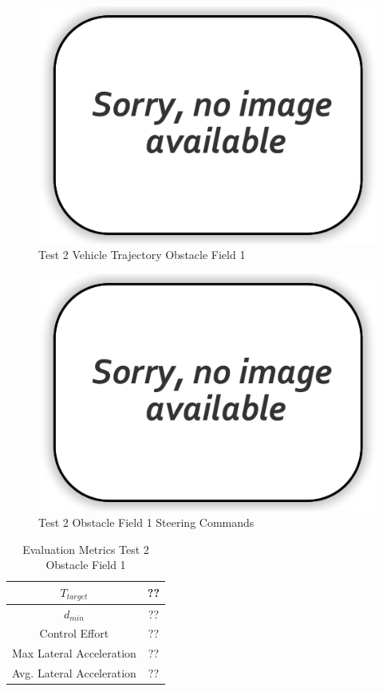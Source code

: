\documentclass[12pt,twocolumn]{article}
\begin{document}
\begin{figure}
	\centering
	\includegraphics[width=\columnwidth]{Figs/no-image.png}
	\caption{\small Test 2 Vehicle Trajectory Obstacle Field 1}  
	\label{fig:Test2_Obst1}
\end{figure}

\begin{figure}
	\centering
	\includegraphics[width=\columnwidth]{Figs/no-image.png}
	\caption{\small Test 2 Obstacle Field 1 Steering Commands}  
	\label{fig:Test2_Obst1_Steer}
\end{figure}

\begin{table}
\begin{center}
	\begin{tabular}{||c |c||} 
		\hline
		$T_{target}$ & ??\\ 
		\hline
		$d_{min}$ & ??\\
		\hline
		Control Effort & ??\\
		\hline
		Max Lateral Acceleration & ??\\
		\hline
		Avg. Lateral Acceleration & ??\\
		\hline
	\end{tabular}
\end{center}
\caption{Evaluation Metrics Test 2 Obstacle Field 1}
\label{t:EvalTest2Obst1}
\end{table}
\end{document}
